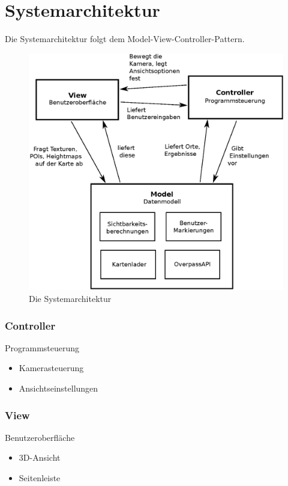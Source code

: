 \documentclass[10pt]{scrreprt}
\begin{document}
\chapter{Systemarchitektur}
Die Systemarchitektur folgt dem Model-View-Controller-Pattern.
\vspace{1cm}
\begin{figure}[h]
\centering
\includegraphics[scale=0.6]{ModelViewController.eps}
\caption{Die Systemarchitektur}
\end{figure}
\pagebreak
\subsection*{Controller}
Programmsteuerung
\begin{itemize}
\item Kamerasteuerung
\item Ansichtseinstellungen
\end{itemize}
\subsection*{View}
Benutzeroberfläche
\begin{itemize}
\item 3D-Ansicht
\item Seitenleiste
\end{itemize}
\end{document}
